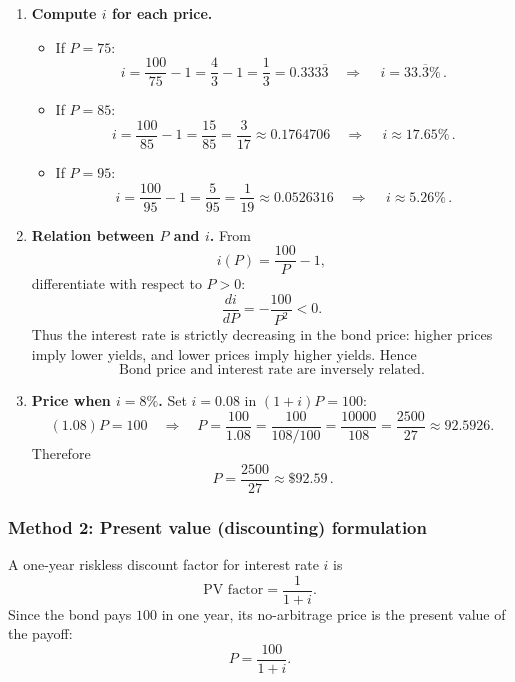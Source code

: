 \documentclass[12pt]{article}
\begin{document}
\begin{enumerate}[label=(\alph*)]
\item \textbf{Compute \(i\) for each price.}
\begin{itemize}[leftmargin=*]
  \item If \(P=75\):
  \[
  i=\frac{100}{75}-1=\frac{4}{3}-1=\frac{1}{3}=0.333\overline{3}
  \quad\Rightarrow\quad
  \boxed{\,i=33.\overline{3}\%\, }.
  \]
  \item If \(P=85\):
  \[
  i=\frac{100}{85}-1=\frac{15}{85}=\frac{3}{17}\approx 0.1764706
  \quad\Rightarrow\quad
  \boxed{\,i\approx 17.65\%\, }.
  \]
  \item If \(P=95\):
  \[
  i=\frac{100}{95}-1=\frac{5}{95}=\frac{1}{19}\approx 0.0526316
  \quad\Rightarrow\quad
  \boxed{\,i\approx 5.26\%\, }.
  \]
\end{itemize}

\item \textbf{Relation between \(P\) and \(i\).}
From
\[
i(P)=\frac{100}{P}-1,
\]
differentiate with respect to \(P>0\):
\[
\frac{di}{dP} = -\frac{100}{P^2}<0.
\]
Thus the interest rate is strictly decreasing in the bond price: higher prices imply lower yields, and lower prices imply higher yields. Hence
\[
\boxed{\,\text{Bond price and interest rate are inversely related.}\,}
\]

\item \textbf{Price when \(i=8\%\).}
Set \(i=0.08\) in \((1+i)P=100\):
\[
(1.08)P=100
\quad\Longrightarrow\quad
P=\frac{100}{1.08}=\frac{100}{108/100}=\frac{10000}{108}=\frac{2500}{27}\approx 92.5926.
\]
Therefore
\[
\boxed{\,P=\frac{2500}{27}\approx \$92.59\, }.
\]
\end{enumerate}

\subsubsection*{Method 2: Present value (discounting) formulation}
A one-year riskless discount factor for interest rate \(i\) is
\[
\text{PV factor}=\frac{1}{1+i}.
\]
Since the bond pays \(100\) in one year, its no-arbitrage price is the present value of the payoff:
\[
P=\frac{100}{1+i}.
\]
\end{document}
